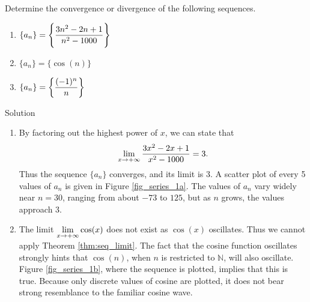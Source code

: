 \begin{example}\label{ex_seq4}
Determine the convergence or divergence of the following sequences.


\begin{multicols}{3}
\begin{enumerate}
    \item  $\displaystyle\{a_n\} = \left\{\frac{3n^2-2n+1}{n^2-1000}\right\}$ \columnbreak
    \vspace*{0.01cm}
    \item $\{a_n\} = \{\cos(n) \}$  \vspace*{0.2cm}
   \columnbreak
 \item  $\displaystyle\{a_n\} = \left\{\frac{(-1)^n}{n}\right\}$
 \end{enumerate}
 \end{multicols}

\pagebreak
{}Solution 

\begin{enumerate}
\item		By factoring out the highest power of $x$, we can state that $$\displaystyle\lim_{x\to+\infty} \frac{3x^2-2x+1}{x^2-1000} = 3.$$
Thus the sequence $\{a_n\}$ converges, and its limit is 3. A scatter plot of every 5 values of $a_n$ is given in Figure \ref{fig_series_1a}. The values of $a_n$ vary widely near $n=30$, ranging from about $-73$ to $125$, but as $n$ grows, the values approach 3.


\item		The limit $\displaystyle\lim_{x\to+\infty}\cos(x)$ does not exist as $\cos(x)$ oscillates. Thus we cannot apply Theorem \ref{thm:seq_limit}.
The fact that the cosine function oscillates strongly hints that $\cos(n)$, when $n$ is restricted to $\mathbb{N}$, will also oscillate. Figure \ref{fig_series_1b}, where the sequence is plotted, implies that this is true. Because only discrete values of cosine are plotted, it does not bear strong resemblance to the familiar cosine wave.


\end{enumerate}
\end{example}
